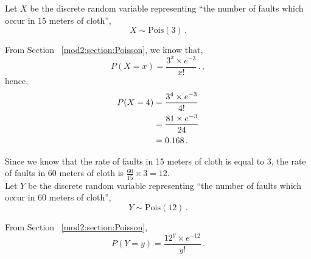%
%

\begin{subquestions}
\subquestion

\begin{subsubquestions}
	
\subsubquestion

Let $X$ be the discrete random variable representing ``the number of faults which occur in 15 meters of cloth'',
\begin{equation}
	X \sim \text{Pois}(3) \,.
\end{equation}
	
From Section ~\ref{mod2:section:Poisson}, we know that,
\begin{equation}
	P(X=x) = \frac{3^{x} \times e^{-3}}{x!} \,. \label{2014:q4:PoisEqn}\,,
\end{equation}
hence,
\begin{align}
	P(X=4) & = \frac{3^{4} \times e^{-3}}{4!} \nonumber \\
	       & = \frac{81 \times e^{-3}}{24} \nonumber \\
	       & = 0.168 \,.
\end{align} 


\subsubquestion

Since we know that the rate of faults in 15 meters of cloth is equal to 3, the rate of faults in 60 meters of cloth is $\frac{60}{15} \times 3 = 12$. \\
Let $Y$ be the discrete random variable representing ``the number of faults which occur in 60 meters of cloth'',
\begin{equation}
	Y \sim \text{Pois}(12) \,.
\end{equation}

From Section ~\ref{mod2:section:Poisson},
\begin{equation}
	P(Y=y) = \frac{12^{y} \times e^{-12}}{y!} \,. \label{2014:q4:PoisEqn2}
\end{equation}


\end{subsubquestions}
\end{subquestions}
